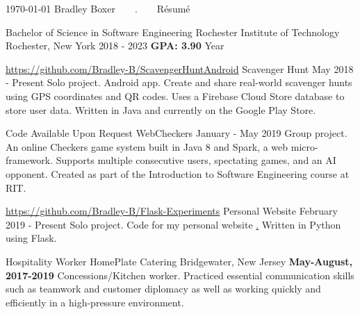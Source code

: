 \documentclass{awesome-cv}
\begin{document}
	\makecvheader[C]

	\makecvfooter
		{\today}
		{Bradley Boxer~~~~.~~~~R\'esum\'e}
		{}

		\begin{cventries}
			\cventry
				{Bachelor of Science in Software Engineering}
				{Rochester Institute of Technology}
				{Rochester, New York}
				{2018 - 2023}
                {\textbf{GPA: 3.90}  Year}
		\end{cventries}

	\cvsection{PROJECTS}
		\begin{cventries}
			\cventry
				{\href{https://github.com/Bradley-B/ScavengerHuntAndroid}{https://github.com/Bradley-B/ScavengerHuntAndroid}}
				{Scavenger Hunt}
				{May 2018 - Present}
				{}
				{Solo project. Android app. Create and share real-world scavenger hunts using GPS coordinates and QR codes. Uses a Firebase Cloud Store database to store user data. Written in Java and currently on the Google Play Store.}

			\cventry
				{Code Available Upon Request}
				{WebCheckers}
				{January - May 2019}
				{}
				{Group project. An online Checkers game system built in Java 8 and Spark, a web micro-framework. Supports multiple consecutive users, spectating games, and an AI opponent. Created as part of the Introduction to Software Engineering course at RIT.}

            		\cventry
                		{\href{https://github.com/Bradley-B/Flask-Experiments}{https://github.com/Bradley-B/Flask-Experiments}}
                		{Personal Website}
                		{February 2019 - Present}
                		{}
                		{Solo project. Code for my personal website \href{http://bradleyboxer.com}. Written in Python using Flask.}

		\end{cventries}
	\cvsection{WORK EXPERIENCE}
		\begin{cventries}
			\cventry
				{Hospitality Worker}
				{HomePlate Catering}
				{Bridgewater, New Jersey}
               			{\textbf{May-August, 2017-2019}}
				{Concessions/Kitchen worker. Practiced essential communication skills such as teamwork and customer diplomacy as well as working quickly and efficiently in a high-pressure environment.}
		\end{cventries}
\end{document}
